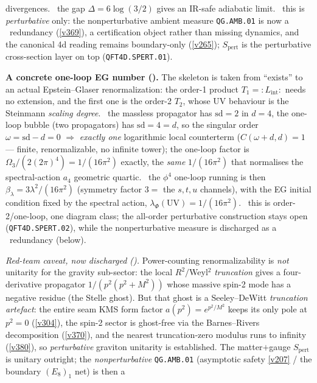 divergences. \mC\ the gap $\Delta=6\log(3/2)$ gives an IR-safe adiabatic limit. \mC\ this is \emph{perturbative}
only: the nonperturbative ambient measure \texttt{QG.AMB.01} is now a \mC\ redundancy (\vref{v369}), a
certification object rather than missing dynamics, and the canonical 4d reading remains
boundary-only (\vref{v265}); $S_{\mathrm{pert}}$ is the perturbative cross-section layer on top
(\texttt{QFT4D.SPERT.01}).
\par\smallskip\noindent\textbf{A concrete one-loop EG number ().}
The skeleton is taken from ``exists'' to an actual Epstein--Glaser renormalization: the order-1 product
$T_1={:}L_{\mathrm{int}}{:}$ needs no extension, and the first one is the order-2 $T_2$, whose UV behaviour is
the Steinmann \emph{scaling degree}. \mE\ the massless propagator has $\mathrm{sd}=2$ in $d=4$, the one-loop
bubble (two propagators) has $\mathrm{sd}=4=d$, so the singular order $\omega=\mathrm{sd}-d=0$ $\Rightarrow$
\emph{exactly one} logarithmic local counterterm ($C(\omega{+}d,d)=1$ --- finite, renormalizable, no infinite
tower); the one-loop factor is $\Omega_3/(2(2\pi)^4)=1/(16\pi^2)$ exactly, the \emph{same} $1/(16\pi^2)$ that
normalises the spectral-action $a_4$ geometric quartic. \mC\ the $\phi^4$ one-loop running is then
$\beta_\lambda=3\lambda^2/(16\pi^2)$ (symmetry factor $3=$ the $s,t,u$ channels), with the EG initial condition
fixed by the spectral action, $\lambda_\Phi(\mathrm{UV})=1/(16\pi^2)$. \mO\ this is order-2/one-loop, one
diagram class; the all-order perturbative construction stays open (\texttt{QFT4D.SPERT.02}), while the
nonperturbative measure is discharged as a \mC\ redundancy (below).
\par\smallskip\noindent\emph{Red-team caveat, now discharged ().} Power-counting
renormalizability is \emph{not} unitarity for the gravity sub-sector: the local $R^2/$Weyl$^2$ \emph{truncation}
gives a four-derivative propagator $1/(p^2(p^2+M^2))$ whose massive spin-2 mode has a negative residue (the Stelle
ghost). But that ghost is a Seeley--DeWitt \emph{truncation artefact}: the entire seam KMS form factor
$a(p^2){=}e^{p^2/M^2}$ keeps its only pole at $p^2{=}0$ (\vref{v304}), the spin-2 sector is ghost-free via the
Barnes--Rivers decomposition (\vref{v370}), and the nearest truncation-zero modulus runs to infinity (\vref{v380}),
so \emph{perturbative} graviton unitarity is established. The matter$+$gauge $S_{\mathrm{pert}}$ is unitary outright;
the \emph{nonperturbative} \texttt{QG.AMB.01} (asymptotic safety \vref{v207} / the boundary $(E_8)_1$ net) is then a
